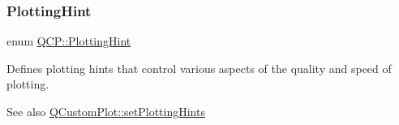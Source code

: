 \mbox{\label{namespace_q_c_p_a5400e5fcb9528d92002ddb938c1f4ef4}} 
\subsubsection{\texorpdfstring{Plotting\+Hint}{PlottingHint}\hspace{0.1cm}{\footnotesize\ttfamily [2/2]}}
{\footnotesize\ttfamily enum \hyperlink{namespace_q_c_p_a5400e5fcb9528d92002ddb938c1f4ef4}{Q\+C\+P\+::\+Plotting\+Hint}}

Defines plotting hints that control various aspects of the quality and speed of plotting.

\begin{DoxySeeAlso}{See also}
\hyperlink{class_q_custom_plot_a94a33cbdadbbac5934843508bcfc210d}{Q\+Custom\+Plot\+::set\+Plotting\+Hints} 
\end{DoxySeeAlso}
